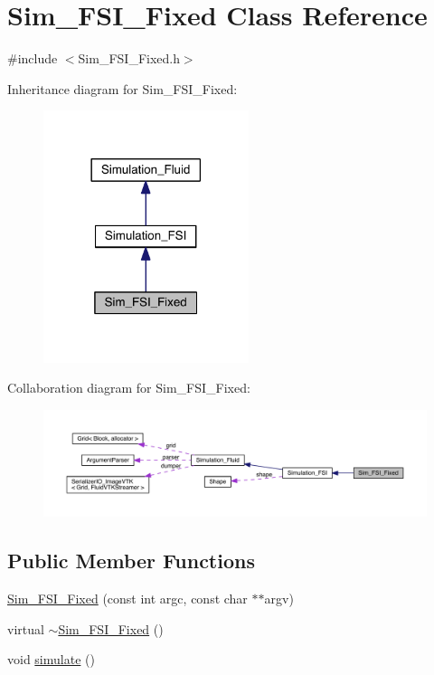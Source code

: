 \hypertarget{class_sim___f_s_i___fixed}{}\section{Sim\+\_\+\+F\+S\+I\+\_\+\+Fixed Class Reference}
\label{class_sim___f_s_i___fixed}


{\ttfamily \#include $<$Sim\+\_\+\+F\+S\+I\+\_\+\+Fixed.\+h$>$}



Inheritance diagram for Sim\+\_\+\+F\+S\+I\+\_\+\+Fixed\+:
\nopagebreak
\begin{figure}[H]
\begin{center}
\leavevmode
\includegraphics[width=170pt]{da/d05/class_sim___f_s_i___fixed__inherit__graph}
\end{center}
\end{figure}


Collaboration diagram for Sim\+\_\+\+F\+S\+I\+\_\+\+Fixed\+:
\nopagebreak
\begin{figure}[H]
\begin{center}
\leavevmode
\includegraphics[width=350pt]{dc/d0c/class_sim___f_s_i___fixed__coll__graph}
\end{center}
\end{figure}
\subsection*{Public Member Functions}
\begin{DoxyCompactItemize}
\item 
\hyperlink{class_sim___f_s_i___fixed_aafc7f4d24e8753e801d70b9a69b2456c}{Sim\+\_\+\+F\+S\+I\+\_\+\+Fixed} (const int argc, const char $\ast$$\ast$argv)
\item 
virtual \hyperlink{class_sim___f_s_i___fixed_a4e3e80cf9ae0a31cc85a491fc9fc3766}{$\sim$\+Sim\+\_\+\+F\+S\+I\+\_\+\+Fixed} ()
\item 
void \hyperlink{class_sim___f_s_i___fixed_a1e37b29e07ddd05ae1f0c2be321e9bb2}{simulate} ()
\end{DoxyCompactItemize}
